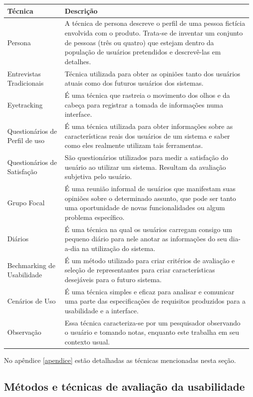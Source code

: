 \begin{tabular}{|p{4cm}|p{11cm}|}
\hline 
Técnica & Descrição \\ 
\hline 
Persona & A técnica de persona descreve o perfil de uma pessoa fictícia envolvida com o produto. Trata-se de inventar um conjunto de pessoas (três ou quatro) que estejam dentro da população de usuários pretendidos e descrevê-las em detalhes. \\ 
\hline 
Entrevistas Tradicionais & Técnica utilizada para obter as opiniões tanto dos usuários atuais como dos futuros usuários dos sistemas. \\ 
\hline 
Eyetracking & É uma técnica que rastreia o movimento dos olhos e da cabeça para registrar a tomada de informações numa interface. \\ 
\hline 
Questionários de Perfil de uso & É uma técnica utilizada para obter informações sobre as características reais dos usuários de um sistema e saber como eles realmente utilizam tais ferramentas. \\ 
\hline 
Questionários de Satisfação & São questionários utilizados para medir a satisfação do usuário ao utilizar um sistema. Resultam da avaliação subjetiva pelo usuário. \\ 
\hline 
Grupo Focal & É uma reunião informal de usuários que manifestam suas opiniões sobre o determinado assunto, que pode ser tanto uma oportunidade de novas funcionalidades ou algum problema específico. \\ 
\hline 
Diários & É uma técnica na qual os usuários carregam consigo um pequeno diário para nele anotar as informações do seu dia-a-dia na utilização do sistema.\\ 
\hline 
Bechmarking de Usabilidade & É um método utilizado para criar critérios de avaliação e seleção de representantes para criar características desejáveis para o futuro sistema. \\ 
\hline 
Cenários de Uso & É uma técnica simples e eficaz para analisar e comunicar uma parte das especificações de requisitos produzidos para a usabilidade e a interface. \\ 
\hline 
Observação & Essa técnica caracteriza-se por um pesquisador observando o usuário e tomando notas, enquanto este trabalha em seu contexto usual. \\ 
\hline  
\end{tabular} 

No apêndice \ref{apendice} estão detalhadas as técnicas mencionadas nesta seção.

\subsection{Métodos e técnicas de avaliação da usabilidade}

